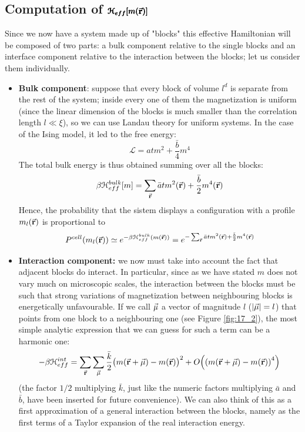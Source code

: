\documentclass[../main/main.tex]{subfiles}
\begin{document}
\subsection{Computation of \( \pmb{\mathcal{H}_{eff} [m(\va{r})]}\)}
 Since we now have a system made up of "blocks" this effective Hamiltonian will be composed of two parts: a bulk component relative to the single blocks and an interface component relative to the interaction between the blocks; let us consider them individually.

 \begin{itemize}
 \item \textbf{Bulk component}: suppose that every block of volume \( l^d \)  is separate from the rest of the system; inside every one of them the magnetization is uniform (since the linear dimension of the blocks is much smaller than the correlation length  \( l \ll \xi  \)), so we can use Landau theory for uniform systems. In the case of the Ising model, it led to the free energy:
\begin{equation*}
  \mathcal{L} = a t m^2 + \frac{\bar{b} }{4} m^4
\end{equation*}
The total bulk energy is thus obtained summing over all the blocks:
\begin{equation}
  \beta \mathcal{H}_{eff}^{bulk} [m] = \sum_{\va{r}}^{}  \bar{a} t m^2 (\va{r})+ \frac{\bar{b} }{2} m^4 (\va{r})
\end{equation}
Hence, the probability that the sistem displays a configuration with a profile \( m_l (\va{r}) \) is proportional to
\begin{equation}
  P^{cell} (m_l (\va{r})) \simeq e^{-\beta \mathcal{H}_{eff}^{bulk} (m (\va{r}))} = e^{ - \sum_{\va{r}}^{}  \bar{a} t m^2 (\va{r})+ \frac{\bar{b} }{2} m^4 (\va{r}) }
\end{equation}


\item \textbf{Interaction component:} we now must take into account the fact that adjacent blocks do interact. In particular, since as we have stated \( m \) does not vary much on microscopic scales, the interaction between the blocks must be such that strong variations of magnetization between neighbouring blocks is energetically unfavourable. If we call \( \va{\mu } \) a vector of magnitude \( l \) (\( \abs{\va{\mu }} =l  \)) that points from one block to a neighbouring one (see Figure \ref{fig:17_2}), the most simple analytic expression that we can guess for such a term can be a harmonic one:
\begin{equation}
  - \beta \mathcal{H}_{eff}^{int} =   \sum_{\va{r}}^{}  \sum_{\va{\mu }}^{}  \frac{\bar{k} }{2} \big( m (\va{r}+\va{\mu }) - m(\va{r})\big)^2 + O \qty( \qty(m (\va{r}+\va{\mu }) - m(\va{r}))^4 )
 \end{equation}
 (the factor \( 1/2 \) multiplying \( \bar{k}  \), just like the numeric factors multiplying \( \bar{a}  \)  and \( \bar{b}  \), have been inserted for future convenience). We can also think of this as a first approximation of a general interaction between the blocks, namely as the first terms of a Taylor expansion of the real interaction energy.


\end{itemize}
\end{document}
